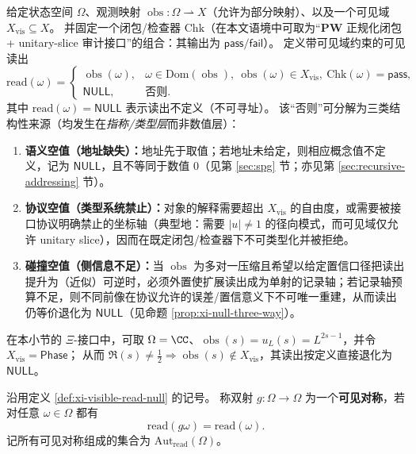 \begin{definition}\label{def:xi-visible-read-null}
给定状态空间 \(\Omega\)、观测映射 \(\operatorname{obs}:\Omega\rightharpoonup X\)（允许为部分映射）、以及一个可见域 \(X_{\mathrm{vis}}\subseteq X\)。
并固定一个闭包/检查器 \(\mathrm{Chk}\)（在本文语境中可取为“\(\mathbf{PW}\) 正规化闭包 + unitary-slice 审计接口”的组合：其输出为 \(\mathsf{pass}/\mathsf{fail}\)）。
定义带可见域约束的可见读出
\[
\mathrm{read}(\omega)=
\begin{cases}
\operatorname{obs}(\omega), &
\omega\in\mathrm{Dom}(\operatorname{obs}),\ \operatorname{obs}(\omega)\in X_{\mathrm{vis}},\ \mathrm{Chk}(\omega)=\mathsf{pass},\\
\mathsf{NULL}, & \text{否则}.
\end{cases}
\]
其中 \(\mathrm{read}(\omega)=\mathsf{NULL}\) 表示读出不定义（不可寻址）。
该“否则”可分解为三类结构性来源（均发生在\emph{指称/类型层}而非数值层）：
\begin{enumerate}
  \item \textbf{语义空值（地址缺失）：}地址先于取值；若地址未给定，则相应概念值不定义，记为 \(\mathsf{NULL}\)，且不等同于数值 \(0\)（见第 \ref{sec:spg} 节；亦见第 \ref{sec:recursive-addressing} 节）。
  \item \textbf{协议空值（类型系统禁止）：}对象的解释需要超出 \(X_{\mathrm{vis}}\) 的自由度，或需要被接口协议明确禁止的坐标轴（典型地：需要 \(|u|\neq 1\) 的径向模式，而可见域仅允许 unitary slice），因而在既定闭包/检查器下不可类型化并被拒绝。
  \item \textbf{碰撞空值（侧信息不足）：}当 \(\operatorname{obs}\) 为多对一压缩且希望以给定置信口径把读出提升为（近似）可逆时，必须外置使扩展读出成为单射的记录轴；若记录轴预算不足，则不同前像在协议允许的误差/置信意义下不可唯一重建，从而读出仍等价退化为 \(\mathsf{NULL}\)（见命题 \ref{prop:xi-null-three-way}）。
\end{enumerate}
在本小节的 \(\Xi\)-接口中，可取 \(\Omega=\CC\)、\(\operatorname{obs}(s)=u_L(s)=L^{2s-1}\)，并令 \(X_{\mathrm{vis}}=\mathsf{Phase}\)；
从而 \(\Re(s)\neq\tfrac12\Rightarrow \operatorname{obs}(s)\notin X_{\mathrm{vis}}\)，其读出按定义直接退化为 \(\mathsf{NULL}\)。
\end{definition}

\begin{definition}\label{def:xi-read-visible-symmetry}
沿用定义 \ref{def:xi-visible-read-null} 的记号。
称双射 \(g:\Omega\to\Omega\) 为一个\textbf{可见对称}，若对任意 \(\omega\in\Omega\) 都有
\[
\mathrm{read}(g\omega)=\mathrm{read}(\omega).
\]
记所有可见对称组成的集合为 \(\mathrm{Aut}_{\mathrm{read}}(\Omega)\)。
\end{definition}

